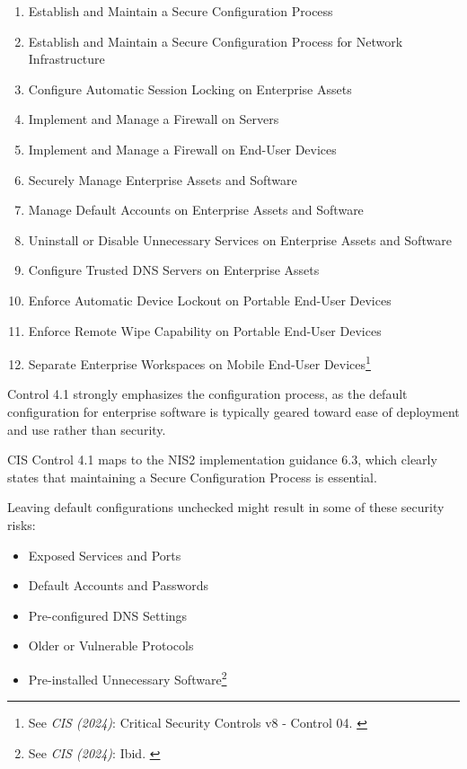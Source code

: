 \begin{enumerate}
    \item Establish and Maintain a Secure Configuration Process
    \item Establish and Maintain a Secure Configuration Process for
Network Infrastructure
    \item Configure Automatic Session Locking on Enterprise Assets
    \item Implement and Manage a Firewall on Servers
    \item Implement and Manage a Firewall on End-User Devices
    \item Securely Manage Enterprise Assets and Software
    \item Manage Default Accounts on Enterprise Assets and Software
    \item Uninstall or Disable Unnecessary Services on Enterprise Assets
and Software
    \item Configure Trusted DNS Servers on Enterprise Assets
    \item Enforce Automatic Device Lockout on Portable End-User Devices
    \item Enforce Remote Wipe Capability on Portable End-User Devices
    \item Separate Enterprise Workspaces on Mobile End-User Devices\footnote{See \textit{CIS (2024)}: Critical Security Controls v8 - Control 04. \cite{cisControls}}
\end{enumerate}

Control 4.1 strongly emphasizes the configuration process, as the default configuration for enterprise software is typically geared toward ease of deployment and use rather than security.

CIS Control 4.1 maps to the NIS2 implementation guidance 6.3, which clearly states that maintaining a Secure Configuration Process is essential.

Leaving default configurations unchecked might result in some of these security risks:

\begin{itemize}
    \item Exposed Services and Ports
    \item Default Accounts and Passwords
    \item Pre-configured DNS Settings
    \item Older or Vulnerable Protocols
    \item Pre-installed Unnecessary Software\footnote{See \textit{CIS (2024)}: Ibid. \cite{cisControls}}
\end{itemize}

